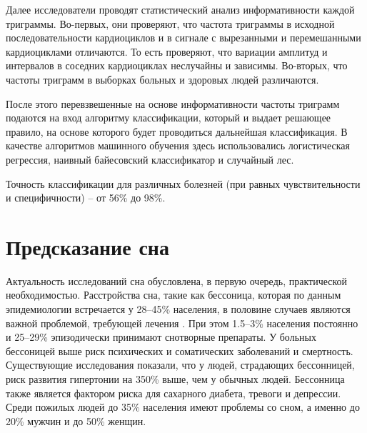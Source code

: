Далее исследователи проводят статистический анализ информативности каждой триграммы. Во-первых, они проверяют, что частота триграммы в исходной последовательности кардиоциклов и в сигнале с вырезанными и перемешанными кардиоциклами отличаются. То есть проверяют, что вариации амплитуд и интервалов в соседних кардиоциклах неслучайны и зависимы. Во-вторых, что частоты триграмм в выборках больных и здоровых людей различаются.

После этого перевзвешенные на основе информативности частоты триграмм подаются на вход алгоритму классификации, который и выдает решающее правило, на основе которого будет проводиться дальнейшая классификация. В качестве алгоритмов машинного обучения здесь использовались логистическая регрессия, наивный байесовский классификатор и случайный лес.

Точность классификации для различных болезней (при равных чувствительности и специфичности) -- от 56\% до 98\%.

\section{Предсказание сна}
Актуальность исследований сна обусловлена, в первую очередь, практической необходимостью. 
Расстройства сна, такие как бессоница, которая по данным эпидемиологии встречается у 28--45\% населения, в половине случаев являются важной проблемой, требующей лечения \cite{sleep3}.
При этом 1.5--3\% населения постоянно и 25--29\% эпизодически принимают снотворные препараты. 
У больных бессоницей выше риск психических и соматических заболеваний и смертность. Существующие исследования показали, что у людей, страдающих бессонницей, риск развития гипертонии на 350\% выше, чем у обычных людей. 
Бессонница также является фактором риска для сахарного диабета, тревоги и депрессии.
Среди пожилых людей до 35\% населения имеют проблемы со сном, а именно до 20\% мужчин и до 50\% женщин. \cite {sleep1, sleep2}

